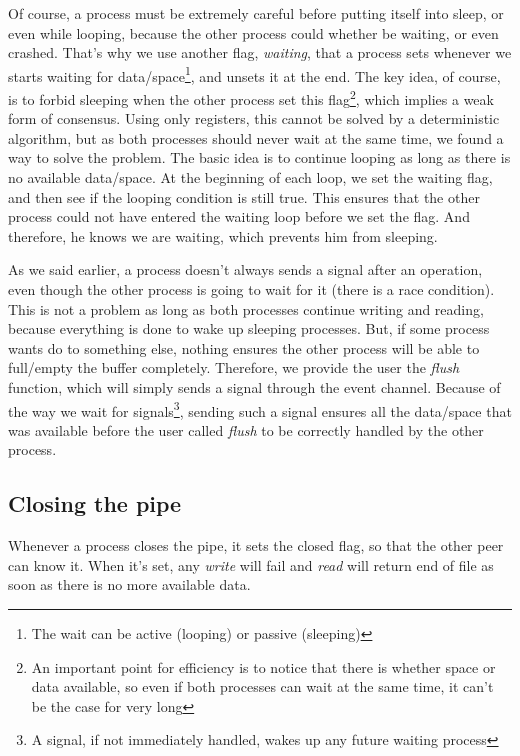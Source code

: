 \documentclass[journal]{IEEEtran}
\begin{document}
Of course, a process must be extremely careful before putting itself into sleep, or even while looping, because the other process could whether be waiting, or even crashed. That's why we use another flag, \emph{waiting}, that a process sets whenever we starts waiting for data/space\footnote{The wait can be active (looping) or passive (sleeping)}, and unsets it at the end. The key idea, of course, is to forbid sleeping when the other process set this flag\footnote{An important point for efficiency is to notice that there is whether space or data available, so even if both processes can wait at the same time, it can't be the case for very long}, which implies a weak form of consensus.
Using only registers, this cannot be solved by a deterministic algorithm, but as both processes should never wait at the same time, we found a way to solve the problem. The basic idea is to continue looping as long as there is no available data/space. At the beginning of each loop, we set the waiting flag, and then see if the looping condition is still true.
This ensures that the other process could not have entered the waiting loop before we set the flag. And therefore, he knows we are waiting, which prevents him from sleeping.

As we said earlier, a process doesn't always sends a signal after an operation, even though the other process is going to wait for it (there is a race condition). This is not a problem as long as both processes continue writing and reading, because everything is done to wake up sleeping processes. But, if some process wants do to something else, nothing ensures the other process will be able to full/empty the buffer completely. Therefore, we provide the user the \emph{flush} function, which will simply sends a signal through the event channel. Because of the way we wait for signals\footnote{A signal, if not immediately handled, wakes up any future waiting process}, sending such a signal ensures all the data/space that was available before the user called \emph{flush} to be correctly handled by the other process. 

\subsection{Closing the pipe}

Whenever a process closes the pipe, it sets the closed flag, so that the other peer can know it. When it's set, any \emph{write} will fail and \emph{read} will return end of file as soon as there is no more available data.  
\end{document}
